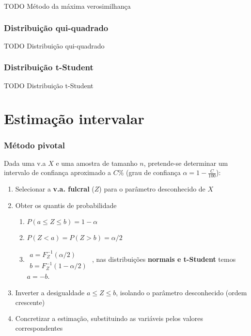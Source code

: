 \documentclass[11pt, a4paper]{article}
\begin{document}
TODO Método da máxima verosimilhança

\subsubsection*{Distribuição qui-quadrado}

TODO Distribuição qui-quadrado

\subsubsection*{Distribuição t-Student}

TODO Distribuição t-Student

\newpage
\section{Estimação intervalar}

\subsubsection*{Método pivotal}

Dada uma v.a $X$ e uma amostra de tamanho $n$, pretende-se determinar um
intervalo de confiança aproximado a $C\%$
(grau de confiança $\alpha = 1 - \frac{C}{100}$):

\begin{enumerate}
    \item Selecionar  a \textbf{v.a. fulcral} ($Z$) para o parâmetro desconhecido de $X$
    \item Obter os quantis de probabilidade
          \begin{enumerate}
              \item $P(a \leq Z \leq b) = 1 - \alpha$
              \item $\displaystyle P(Z < a) = P(Z > b) = \alpha / 2$
              \item $
                        \begin{array}{l}
                            \displaystyle a = F^{-1}_Z \left(\alpha / 2\right) \\
                            \displaystyle b = F^{-1}_Z \left(1 - \alpha / 2\right)
                        \end{array}$
                    , nas distribuições \textbf{normais e t-Student} temos $a = -b$.
          \end{enumerate}
    \item Inverter a desigualdade $a \leq Z \leq b$, isolando o parâmetro
          desconhecido (ordem crescente)
    \item Concretizar a estimação, substituindo as variáveis pelos valores correspondentes
\end{enumerate}
\end{document}
